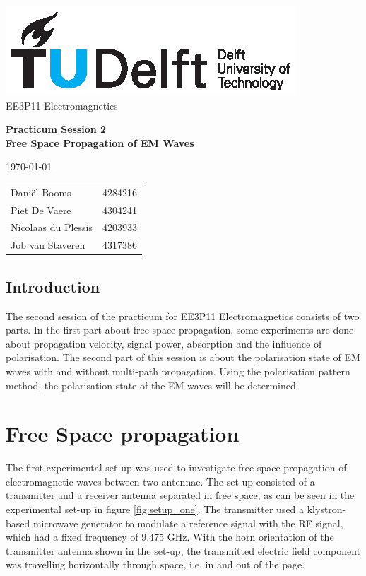 \documentclass[11pt,a4paper]{article}
\begin{document}
\noindent
\begin{center}
\includegraphics[width=\columnwidth]{tudelftlogo.eps} \\

EE3P11 Electromagnetics\\
\begin{LARGE}
\textbf{Practicum Session 2 \\ Free Space Propagation of EM Waves} \\[0.3cm]
\end{LARGE}
\today \\[.2cm]
\begin{tabular}{l l}
Dani\"el Booms & 4284216 \\
Piet De Vaere & 4304241 \\
Nicolaas du Plessis & 4203933 \\
Job van Staveren & 4317386

\end{tabular}
\end{center}


\subsection*{Introduction}
The second session of the practicum for EE3P11 Electromagnetics consists of two parts.
In the first part about free space propagation, some experiments are done about propagation velocity, signal power, absorption and the influence of polarisation.
The second part of this session is about the polarisation state of EM waves with and without multi-path propagation.
Using the polarisation pattern method, the polarisation state of the EM waves will be determined.


\section{Free Space propagation}

The first experimental set-up was used to investigate free space propagation of electromagnetic waves between two antennae.
The set-up consisted of a transmitter and a receiver antenna separated in free space, as can be seen in the experimental set-up in figure \ref{fig:setup_one}.
The transmitter used a klystron-based microwave generator to modulate a reference signal with the RF signal, which had a fixed frequency of $9.475$ GHz.
With the horn orientation of the transmitter antenna shown in the set-up, the transmitted electric field component was travelling horizontally through space, i.e. in and out of the page.\\
\end{document}
